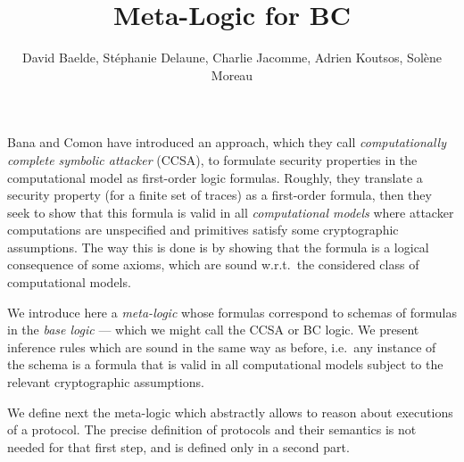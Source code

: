 \documentclass[a4paper]{article}
\theoremstyle{remark}
\begin{document}
\title{Meta-Logic for BC}

\author{David Baelde, Stéphanie Delaune,
  Charlie Jacomme, Adrien Koutsos, Solène Moreau}

\maketitle

\vfill

\tableofcontents

\vfill

Bana and Comon have introduced an approach, which they call
\emph{computationally complete symbolic attacker} (CCSA),
to formulate security properties in the computational model as first-order
logic formulas. Roughly, they translate a security property (for a finite set
of traces) as a first-order formula, then they seek to show that this formula
is valid in all \emph{computational models} where attacker computations
are unspecified and primitives satisfy some cryptographic assumptions. The
way this is done is by showing that the formula is a logical consequence of
some axioms, which are sound w.r.t.\ the considered class of computational
models.

We introduce here a \emph{meta-logic} whose formulas correspond to schemas
of formulas in the \emph{base logic}
--- which we might call the CCSA or BC logic.
We present inference rules which are sound in the same way as before,
i.e.\ any instance of the schema is a formula that is valid in all
computational models subject to the relevant cryptographic assumptions.

We define next the meta-logic which abstractly allows to reason about
executions of a protocol. The precise definition of protocols and their
semantics is not needed for that first step, and is defined only in a
second part.










\end{document}
